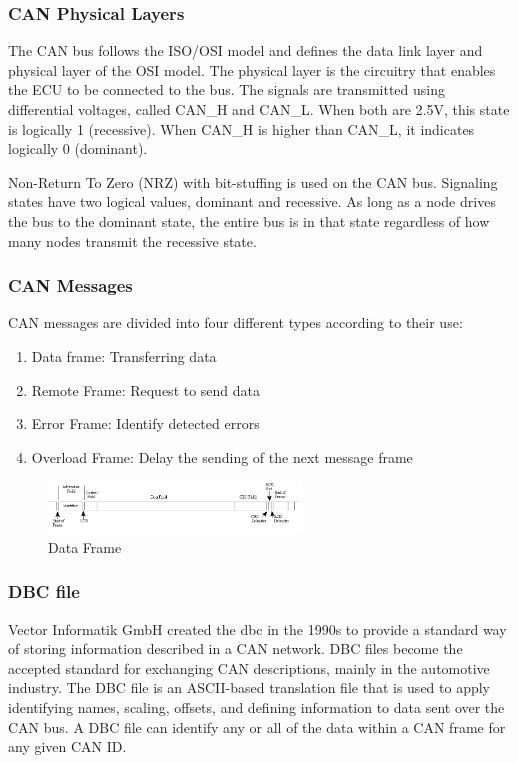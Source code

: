 \subsubsection{CAN Physical Layers}
The CAN bus follows the ISO/OSI model and defines the data link layer and physical layer of the OSI model. The physical layer is the circuitry that enables the ECU to be connected to the bus. The signals are transmitted using differential voltages, called CAN\_H and CAN\_L. When both are 2.5V, this state is logically 1 (recessive). When CAN\_H is higher than CAN\_L, it indicates logically 0 (dominant).

Non-Return To Zero (NRZ) with bit-stuffing is used on the CAN bus. Signaling states have two logical values, dominant and recessive. As long as a node drives the bus to the dominant state, the entire bus is in that state regardless of how many nodes transmit the recessive state\cite{can_protocol}.

\subsubsection{CAN Messages}
CAN messages are divided into four different types according to their use:
\begin{enumerate}
    \item Data frame: Transferring data
    \item Remote Frame: Request to send data
    \item Error Frame: Identify detected errors
    \item Overload Frame: Delay the sending of the next message frame
\end{enumerate}

\begin{figure}[hbt!]
    \centering
    \includegraphics[width=0.6\textwidth]{gfx/data_framepng.png}
    \caption{Data Frame\cite{can_protocol}}
    \label{fig:data_frame}
\end{figure}

\subsubsection{DBC file}
Vector Informatik GmbH created the \ac{dbc} in the 1990s to provide a standard way of storing information described in a CAN network. DBC files become the accepted standard for exchanging CAN descriptions, mainly in the automotive industry. The DBC file is an ASCII-based translation file that is used to apply identifying names, scaling, offsets, and defining information to data sent over the CAN bus. A DBC file can identify any or all of the data within a CAN frame for any given CAN ID\cite{kvaser_2021}.

